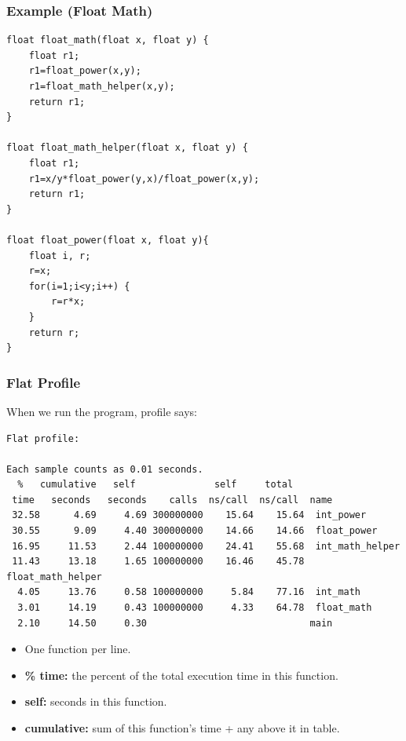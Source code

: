 \begin{frame}[fragile]
  \frametitle{Example (Float Math)}


\begin{changemargin}{1.5cm}
  
  \begin{lstlisting}
float float_math(float x, float y) {
    float r1;
    r1=float_power(x,y);
    r1=float_math_helper(x,y);
    return r1;
}

float float_math_helper(float x, float y) {
    float r1;
    r1=x/y*float_power(y,x)/float_power(x,y);
    return r1;
}

float float_power(float x, float y){
    float i, r;
    r=x;
    for(i=1;i<y;i++) {
        r=r*x;
    }
    return r;
}
  \end{lstlisting}
  \end{changemargin}

\end{frame}

\begin{frame}[fragile]
  \frametitle{Flat Profile}


\begin{changemargin}{1.5cm}

    When we run the program, profile says:

{
  \begin{lstlisting}[basicstyle=\tiny]
Flat profile:

Each sample counts as 0.01 seconds.
  %   cumulative   self              self     total           
 time   seconds   seconds    calls  ns/call  ns/call  name    
 32.58      4.69     4.69 300000000    15.64    15.64  int_power
 30.55      9.09     4.40 300000000    14.66    14.66  float_power
 16.95     11.53     2.44 100000000    24.41    55.68  int_math_helper
 11.43     13.18     1.65 100000000    16.46    45.78  float_math_helper
  4.05     13.76     0.58 100000000     5.84    77.16  int_math
  3.01     14.19     0.43 100000000     4.33    64.78  float_math
  2.10     14.50     0.30                             main
  \end{lstlisting}
}

  \begin{itemize}
    \item One function per line.
    \item {\bf \% time:} the percent of the total execution time in this function.
    \item {\bf self:} seconds in this function.
    \item {\bf cumulative:} sum of this function's time + any above it in table.
  \end{itemize}
  \end{changemargin}
\end{frame}

